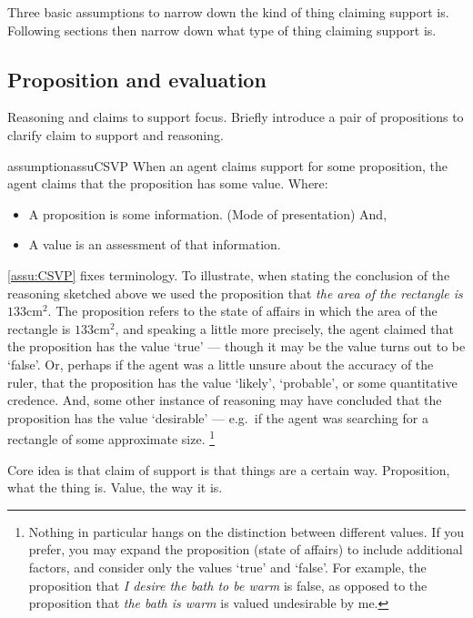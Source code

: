 \begin{note}
  Three basic assumptions to narrow down the kind of thing claiming support is.
  Following sections then narrow down what type of thing claiming support is.
\end{note}

\subsection{Proposition and evaluation}

\begin{note}
  Reasoning and claims to support focus.
  Briefly introduce a pair of propositions to clarify claim to support and reasoning.

  \begin{restatable}{assumption}{assuCSVP}
    \label{assu:CSVP}
    When an agent claims support for some proposition, the agent claims that the proposition has some value.
    Where:
    \begin{itemize}
    \item A proposition is some information. (Mode of presentation) And,
    \item A value is an assessment of that information.
    \end{itemize}
    \vspace{-\baselineskip}
  \end{restatable}
  \autoref{assu:CSVP} fixes terminology.
  To illustrate, when stating the conclusion of the reasoning sketched above we used the proposition that \emph{the area of the rectangle is \(133\text{cm}^{2}\)}.
  The proposition refers to the state of affairs in which the area of the rectangle is \(133\text{cm}^{2}\), and speaking a little more precisely, the agent claimed that the proposition has the value `true' --- though it may be the value turns out to be `false'.
  Or, perhaps if the agent was a little unsure about the accuracy of the ruler, that the proposition has the value `likely', `probable', or some quantitative credence.
  And, some other instance of reasoning may have concluded that the proposition has the value `desirable' --- e.g.\ if the agent was searching for a rectangle of some approximate size.\nolinebreak
  \footnote{
    Nothing in particular hangs on the distinction between different values.
    If you prefer, you may expand the proposition (state of affairs) to include additional factors, and consider only the values `true' and `false'.
    For example, the proposition that \emph{I desire the bath to be warm} is false, as opposed to the proposition that \emph{the bath is warm} is valued undesirable by me.
  }

  Core idea is that claim of support is that things are a certain way.
  Proposition, what the thing is.
  Value, the way it is.
\end{note}

